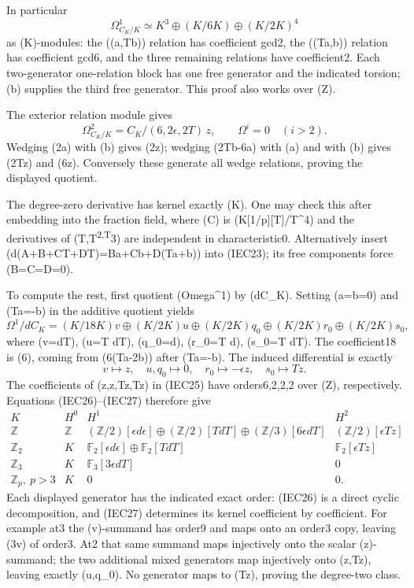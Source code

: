 \documentclass[
]{article}
\begin{document}
In particular \[
\Omega^1_{C_K/K}\simeq K^3\oplus(K/6K)\oplus(K/2K)^4
\tag{IEC24}
\] as (K)-modules: the ((a,Tb)) relation has coefficient gcd2, the
((Ta,\epsilon b)) relation has coefficient gcd6, and the three remaining
relations have coefficient2. Each two-generator one-relation block has
one free generator and the indicated torsion; (b) supplies the third
free generator. This proof also works over (\mathbb Z).

The exterior relation module gives \[
\Omega^2_{C_K/K}=C_K/(6,2\epsilon,2T)\,z,
\qquad\Omega^i=0\quad(i>2).
\tag{IEC25}
\] Wedging (2\epsilon a) with (b) gives (2\epsilon z); wedging (2Tb-6a)
with (a) and with (b) gives (2Tz) and (6z). Conversely these generate
all wedge relations, proving the displayed quotient.

The degree-zero derivative has kernel exactly (K). One may check this
after embedding into the fraction field, where (C) is
(K{[}1/p{]}{[}T{]}/T\^{}4) and the derivatives of
(T,T\textsuperscript{2,T}3) are independent in characteristic0.
Alternatively insert
(d(A+B\epsilon+CT+D\epsilon T)=Ba+Cb+D(Ta+\epsilon b)) into (IEC23); its
free components force (B=C=D=0).

To compute the rest, first quotient (Omega\^{}1) by (dC\_K). Setting
(a=b=0) and (Ta=-\epsilon b) in the additive quotient yields \[
\Omega^1/dC_K=(K/18K)v\oplus(K/2K)u\oplus(K/2K)q_0
\oplus(K/2K)r_0\oplus(K/2K)s_0,
\tag{IEC26}
\] where (v=\epsilon dT), (u=T dT), (q\_0=\epsilon d\epsilon),
(r\_0=\epsilon T d\epsilon), (s\_0=\epsilon T dT). The coefficient18 is
(6), coming from (6(Ta-2\epsilon b)) after (Ta=-\epsilon b). The
induced differential is exactly \[
v\mapsto z,\quad u,q_0\mapsto0,\quad
r_0\mapsto-\epsilon z,\quad s_0\mapsto Tz.
\tag{IEC27}
\] The coefficients of (z,\epsilon z,Tz,\epsilon Tz) in (IEC25) have
orders6,2,2,2 over (\mathbb Z), respectively. Equations (IEC26)--(IEC27)
therefore give \[
\begin{array}{c|c|c|c}
K&H^0&H^1&H^2\\\hline
\mathbb Z&\mathbb Z&(\mathbb Z/2)[\epsilon d\epsilon]\oplus(\mathbb Z/2)[T dT]\oplus(\mathbb Z/3)[6\epsilon dT]&(\mathbb Z/2)[\epsilon Tz]\\
\mathbb Z_2&K&\mathbb F_2[\epsilon d\epsilon]\oplus\mathbb F_2[T dT]&\mathbb F_2[\epsilon Tz]\\
\mathbb Z_3&K&\mathbb F_3[3\epsilon dT]&0\\
\mathbb Z_p,\ p>3&K&0&0.
\end{array}
\tag{IEC28}
\] Each displayed generator has the indicated exact order: (IEC26) is a
direct cyclic decomposition, and (IEC27) determines its kernel
coefficient by coefficient. For example at3 the (v)-summand has order9
and maps onto an order3 copy, leaving (3v) of order3. At2 that same
summand maps injectively onto the scalar (z)-summand; the two additional
mixed generators map injectively onto (\epsilon z,Tz), leaving exactly
(u,q\_0). No generator maps to (\epsilon Tz), proving the degree-two
class.
\end{document}
